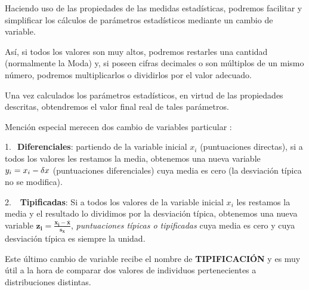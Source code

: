 \begin{definition}
	
Haciendo uso de las propiedades de las medidas estadísticas, podremos facilitar y simplificar los cálculos de parámetros estadísticos mediante un cambio de variable.

\vspace{2mm} Así, si todos los valores son muy altos, podremos restarles una cantidad (normalmente la Moda) y, si poseen cifras decimales o son múltiplos de un mismo número, podremos multiplicarlos o dividirlos por el valor adecuado. 

\vspace{2mm} Una vez calculados los parámetros estadísticos, en virtud de las propiedades descritas, obtendremos el valor final real de tales parámetros. 

\vspace{2mm} Mención especial merecen dos cambio de variables particular : 

1.$\ $ \textbf{Diferenciales}: partiendo de la variable inicial $x_i$ (puntuaciones directas), si a todos los valores les restamos la media, obtenemos una nueva variable $y_i=x_i-\var x$ (puntuaciones diferenciales) cuya media es cero (la desviación típica no se modifica). 

2.$\ $  \textbf{Tipificadas}: Si a todos los valores de la variable inicial $x_i$ les restamos la media y el resultado lo dividimos por la desviación típica, obtenemos una nueva variable $\boldsymbol{z_i=\frac{x_i-\bar x}{s_x}}$, \emph{puntuaciones típicas o tipificadas} cuya media es cero y cuya  desviación típica es siempre la unidad. 

\vspace{2mm} Este último cambio de variable recibe el nombre de \textbf{TIPIFICACIÓN} y es muy útil a la hora de comparar dos valores de individuos pertenecientes a distribuciones distintas.
\end{definition}


